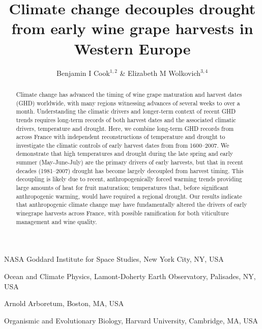 \documentclass[final]{nature}
\title{Climate change decouples drought from early wine grape harvests in Western Europe}
\author{Benjamin I Cook$^{1,2}$ \& Elizabeth M Wolkovich$^{3,4}$}
\begin{document}
\maketitle

\begin{affiliations}
 \item NASA Goddard Institute for Space Studies, New York City, NY, USA
 \item Ocean and Climate Physics, Lamont-Doherty Earth Observatory, Palisades, NY, USA
 \item Arnold Arboretum, Boston, MA, USA
 \item Organismic and Evolutionary Biology, Harvard University, Cambridge, MA, USA
\end{affiliations}

\begin{abstract}
Climate change has advanced the timing of wine grape maturation and harvest dates (GHD) worldwide, with many regions witnessing advances of several weeks to over a month\cite{Duchene:2005bd,Seguin2005,webb2011}. Understanding the climatic drivers and longer-term context of recent GHD trends requires long-term records of both harvest dates and the associated climatic drivers, temperature and drought. Here, we combine long-term GHD records from across France\cite{Daux2012} with independent reconstructions of temperature\cite{Luterbacher2004} and drought\cite{CookOWDA2015,Pauling2006} to investigate the climatic controls of early harvest dates from from 1600--2007. We demonstrate that high temperatures and drought during the late spring and early summer (May-June-July) are the primary drivers of early harvests, but that in recent decades (1981--2007) drought has become largely decoupled from harvest timing. This decoupling is likely due to recent, anthropogenically forced warming trends providing large amounts of heat for fruit maturation; temperatures that, before significant anthropogenic warming, would have required a regional drought. Our results indicate that anthropogenic climate change may have fundamentally altered the drivers of early winegrape harvests across France, with possible ramification for both viticulture management and wine quality.
\end{abstract}
\end{document}
